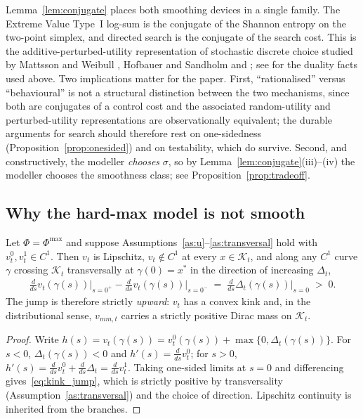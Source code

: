 Lemma~\ref{lem:conjugate} places both smoothing devices in a single family. The
Extreme Value Type~I log-sum is the conjugate of the Shannon entropy on the two-point
simplex, and directed search is the conjugate of the search cost. This is the
additive-perturbed-utility representation of stochastic discrete choice studied by
Mattsson and Weibull \citeyearpar{Mattsson2002-pc}, Hofbauer and Sandholm
\citeyearpar{Hofbauer2002-gc} and \citet{Fudenberg2015-sv}; see
\citet{Rockafellar1970-cv} for the duality facts used above. Two implications matter
for the paper. First, ``rationalised'' versus ``behavioural'' is not a structural
distinction between the two mechanisms, since both are conjugates of a control cost
and the associated random-utility and perturbed-utility representations are
observationally equivalent; the durable arguments for search should therefore rest on
one-sidedness (Proposition~\ref{prop:onesided}) and on testability, which do survive.
Second, and constructively, the modeller \emph{chooses} $\sigma$, so by
Lemma~\ref{lem:conjugate}(iii)--(iv) the modeller chooses the smoothness class; see
Proposition~\ref{prop:tradeoff}.

\subsection{Why the hard-max model is not smooth}
\label{subsec:smooth_negative}

\begin{proposition}
\label{prop:kink}
Let $\Phi=\Phi^{\max}$ and suppose Assumptions~\ref{as:u}--\ref{as:transversal} hold
with $v_t^{0},v_t^{1}\in C^{1}$. Then $v_t$ is Lipschitz, $v_t\notin C^{1}$ at every
$x\in\mathcal{K}_t$, and along any $C^{1}$ curve $\gamma$ crossing $\mathcal{K}_t$
transversally at $\gamma(0)=x^{\ast}$ in the direction of increasing $\Delta_t$,
\begin{align}
\frac{d}{ds}v_t(\gamma(s))\Big|_{s=0^{+}} - \frac{d}{ds}v_t(\gamma(s))\Big|_{s=0^{-}}
\;=\; \frac{d}{ds}\Delta_t(\gamma(s))\Big|_{s=0} \;>\;0 .
\label{eq:kink_jump}
\end{align}
The jump is therefore strictly \emph{upward}: $v_t$ has a convex kink and, in the
distributional sense, $v_{mm,t}$ carries a strictly positive Dirac mass on
$\mathcal{K}_t$.
\end{proposition}

\begin{proof}
Write $h(s)=v_t(\gamma(s))=v_t^{0}(\gamma(s))+\max\{0,\Delta_t(\gamma(s))\}$. For
$s<0$, $\Delta_t(\gamma(s))<0$ and $h'(s)=\tfrac{d}{ds}v_t^{0}$; for $s>0$,
$h'(s)=\tfrac{d}{ds}v_t^{0}+\tfrac{d}{ds}\Delta_t=\tfrac{d}{ds}v_t^{1}$. Taking
one-sided limits at $s=0$ and differencing gives~\eqref{eq:kink_jump}, which is
strictly positive by transversality (Assumption~\ref{as:transversal}) and the choice of
direction. Lipschitz continuity is inherited from the branches.
\end{proof}

